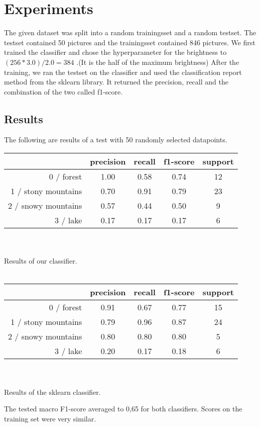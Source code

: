 \documentclass[a4paper,12pt]{article}
\newcommand{\initials}[1]{\marginpar{\quad\texttt{#1}}}
\begin{document}
	\section{Experiments}
	The given dataset was split into a random trainingsset and a random testset. The testset contained 50 pictures and the trainingsset contained 846 pictures. 
	We first trained the classifier and chose the hyperparameter for the brightness to $(256*3.0)/2.0=384$ .(It is the half of the maximum brightness) 
	After the training, we ran the testset on the classifier and used the classification report method from the sklearn library.
	It returned the precision, recall and the combination of the two called f1-score.
	\initials{MA}
\subsection{Results}
The following are results of a test with 50 randomly selected datapoints.
\begin{center}
	\begin{tabular}{r || c | c | c | c}
			& precision & recall & f1-score & support\\ \hline
			0 / forest & 1.00 & 0.58 & 0.74 & 12 \\
			1 / stony mountains & 0.70 & 0.91 & 0.79 & 23 \\
			2 / snowy mountains & 0.57 & 0.44 & 0.50 & 9 \\
			3 / lake & 0.17 & 0.17 & 0.17 & 6 \\
	\end{tabular}\\
\ \\
Results of our classifier.\\
\ \\
	\begin{tabular}{r || c | c | c | c}
		& precision & recall & f1-score & support\\ \hline
		0 / forest & 0.91 & 0.67 & 0.77 & 15 \\
		1 / stony mountains & 0.79 & 0.96 & 0.87 & 24 \\
		2 / snowy mountains & 0.80 & 0.80 & 0.80 & 5 \\
		3 / lake & 0.20 & 0.17 & 0.18 & 6 \\
	\end{tabular}\\
\ \\
Results of the sklearn classifier.\\

\end{center}
The tested macro F1-score averaged to 0,65 for both classifiers.
Scores on the training set were very similar.
\initials{TB}
\end{document}
